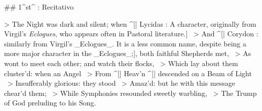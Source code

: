 ## 1^st^ \mvmt: Recitativo


> The Night was dark and silent; when ^[| Lycidas : A character, originally from Virgil's \textit{Eclogues}, who appears often in Pastoral literature.] \
> And ^[| Corydon : similarly from Virgil's _Eclogues_. It is a less common name, despite being a more major character in the _Eclogues_;], both faithful Shepherds met,  \
> As wont to meet each other; and watch their flocks,  \
> Which lay about them cluster’d: when an Angel  \
> From ^[| Heav’n ^[| descended on a Beam of Light  \
> Insufferably glorious: they stood  \
> Amaz’d: but he with this message chear’d them;  \
> While Symphonies resounded sweetly warbling,  \
> The Trump of God preluding to his Song.
